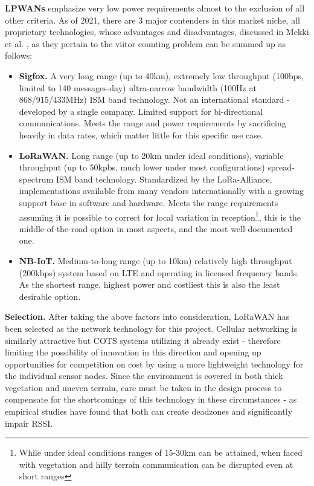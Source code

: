 \documentclass[10pt,nocopyrightspace]{ewsn-proc}
\begin{document}
\textbf{LPWANs} emphasize very low power requirements almost to the exclusion of all other criteria. As of 2021, there are 3 major contenders in this market niche, all proprietary technologies, whose advantages and disadvantages, discussed in Mekki et al. \cite{LPWAN-compare}, as they pertain to the viitor counting problem can be summed up as follows:
\begin{itemize}
\item \textbf{Sigfox.} A very long range (up to 40km), extremely low throughput (100bps, limited to 140 messages-day) ultra-narrow bandwidth (100Hz at 868/915/433MHz) ISM band technology. Not an international standard - developed by a single company. Limited support for bi-directional communications. Meets the range and power requirements by sacrificing heavily in data rates, which matter little for this specific use case. 
\item \textbf{LoRaWAN.} Long range (up to 20km under ideal conditions), variable throughput (up to 50kpbs, much lower under most configurations) spread-spectrum ISM band technology. Standardized by the LoRa-Alliance, implementations available from many vendors internationally with a growing support base in software and hardware. Meets the range requirements assuming it is possible to correct for local variation in reception\footnote{While under ideal conditions\cite{LORAWAN-optimal} ranges of 15-30km can be attained, when faced with vegetation and hilly terrain communication can be disrupted even at short ranges\cite{LORAWAN-hills}}, this is the middle-of-the-road option in most aspects, and the most well-documented one.
\item \textbf{NB-IoT.} Medium-to-long range (up to 10km) relatively high throughput (200kbps) system based on LTE and operating in licensed frequency bands. As the shortest range, highest power and costliest this is also the least desirable option.
\end{itemize}

\textbf{Selection.} After taking the above factors into consideration, LoRaWAN has been selected as the network technology for this project. Cellular networking is similarly attractive but COTS systems utilizing it already exist - therefore limiting the possibility of innovation in this direction and opening up opportunities for competition on cost by using a more lightweight technology for the individual sensor nodes. Since the environment is covered in both thick vegetation and uneven terrain, care must be taken in the design process to compensate for the shortcomings of this technology in these circumstances - as empirical studies have found\cite{LORAWAN-hills} that both can create deadzones and significantly impair RSSI.
\end{document}
